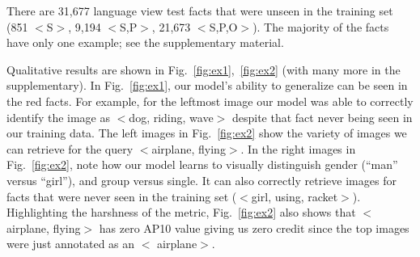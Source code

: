 \documentclass[runningheads]{llncs}
\begin{document}
There are 31,677 language view test facts  that were unseen in the training set (851 $<$S$>$, 9,194 $<$S,P$>$, 21,673 $<$S,P,O$>$).
The majority of the facts have only one example; see the supplementary material.

Qualitative results are shown in Fig.~\ref{fig:ex1},~\ref{fig:ex2} (with many more in the supplementary).  In Fig.~\ref{fig:ex1}, our model's ability to generalize can be seen in the red facts.  For example, for the leftmost image our model was able to correctly identify the image as $<$dog, riding, wave$>$ despite that fact never being seen in our training data.  The left images in Fig.~\ref{fig:ex2} show the variety of images we can retrieve for the query $<$airplane, flying$>$.  In the right images in Fig.~\ref{fig:ex2}, note how our model learns to visually distinguish gender (``man'' versus ``girl''), and group versus single. It can also correctly retrieve images for facts that were never seen in the training set ($<$girl, using, racket$>$). Highlighting the harshness of the metric, Fig.~\ref{fig:ex2} also shows that   $<$airplane, flying$>$ has zero AP10 value giving us zero credit since the top images were just annotated as an $<$ airplane$>$.
\end{document}
